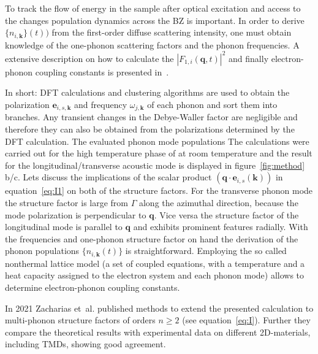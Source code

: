 To track the flow of energy in the sample after optical excitation and access to the changes population dynamics across the \ac{BZ} is important.
In order to derive $\{n_{i,\mathbf{k}}\}(t))$ from the first-order diffuse scattering intensity, one must obtain knowledge of the one-phonon scattering factors and the phonon frequencies.
A extensive description on how to calculate the $\left| F_{1,i}(\mathbf{q},t) \right|^2$ and finally electron-phonon coupling constants is presented in~\cite{stern2018,renedecotret2019}.

In short: \Ac{DFT} calculations and clustering algorithms are used to obtain the polarization $\mathbf{e}_{i,s,\mathbf{k}}$ and frequency $\omega_{j,\mathbf{k}}$ of each phonon and sort them into branches.
Any transient changes in the Debye-Waller factor are negligible and therefore they can also be obtained from the polarizations determined by the \ac{DFT} calculation.
The evaluated phonon mode populations 
The calculations were carried out for the high temperature phase of \ts at room temperature and the result for the longitudinal/transverse acoustic mode is displayed in figure~\ref{fig:method}\,b/c.
Lets discuss the implications of the scalar product $\left( \mathbf{q}\cdot\mathbf{e}_{i, s}(\mathbf{k}) \right)$ in equation~\ref{eq:I1} on both of the structure factors.
For the transverse phonon mode the structure factor is large from $\Gamma$ along the azimuthal direction, because the mode polarization is perpendicular to $\mathbf{q}$.
Vice versa the structure factor of the longitudinal mode is parallel to $\mathbf{q}$ and exhibits prominent features radially.
With the frequencies and one-phonon structure factor on hand the derivation of the phonon populations $\{n_{i,\mathbf{k}}(t)\}$ is straightforward.
Employing the so called nonthermal lattice model\cite{waldecker2016} (a set of coupled equations, with a temperature and a heat capacity assigned to the electron system and each phonon mode) allows to determine electron-phonon coupling constants.

In 2021 Zacharias et~al. published methods to extend the presented calculation to multi-phonon structure factors of orders $n\geq 2$ (see equation~\ref{eq:I}).
Further they compare the theoretical results with experimental data on different 2D-materials, including \acp{TMD}, showing good agreement\cite{zacharias2021a,zacharias2021b}.

